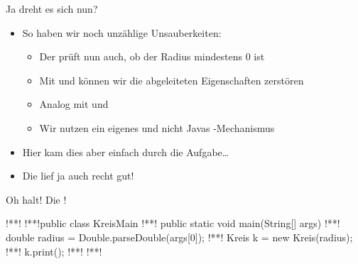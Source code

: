 \begin{frame}{Ja dreht es sich nun?}
    \begin{itemize}[<+(1)->]
        \itemsep6pt
        \item So haben wir noch unzählige Unsauberkeiten: \begin{itemize}
            \item Der  prüft nun auch, ob der Radius mindestens \(0\) ist 
            \item Mit  und  können wir die abgeleiteten Eigenschaften zerstören
            \item Analog mit  und 
            \item Wir nutzen ein eigenes  und nicht Javas -Mechanismus
        \end{itemize}
        \item Hier kam dies aber einfach durch die Aufgabe\ldots
        \item Die lief ja auch recht gut!
    \end{itemize}
\end{frame}
\fi

\begin{frame}[fragile,c]{Oh halt! Die !}
\begin{plainjava}
!**!
!**!public class KreisMain {
!**!   public static void main(String[] args) {
!**!       double radius = Double.parseDouble(args[0]);
!**!       Kreis k = new Kreis(radius);
!**!       k.print();
!**!   }
!**!}
\end{plainjava}
\end{frame}

